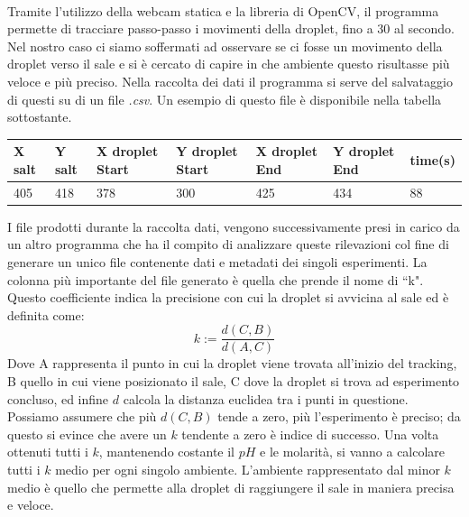 \\Tramite l'utilizzo della webcam statica e la libreria di OpenCV, il programma permette di tracciare passo-passo i movimenti della droplet, fino a 30 al secondo. \\Nel nostro caso ci siamo soffermati ad osservare se ci fosse un movimento della droplet verso il sale e si è cercato di capire in che ambiente questo risultasse più veloce e più preciso. Nella raccolta dei dati il programma si serve del salvataggio di questi su di un file \emph{.csv}. Un esempio di questo file è disponibile nella tabella sottostante. 
\begin{center}
\begin{tabular}{lllllll}
X salt & Y salt & X droplet Start & Y droplet Start & X droplet End & Y droplet End & time(s) \\
\hline
405    & 418    & 378             & 300             & 425           & 434           & 88  
\end{tabular}
\end{center}
I file prodotti durante la raccolta dati, vengono successivamente presi in carico da un altro programma che ha il compito di analizzare queste rilevazioni col fine di generare un unico file contenente dati e metadati dei singoli esperimenti. La colonna più importante del file generato è quella che prende il nome di ``k". Questo coefficiente indica la precisione con cui la droplet si avvicina al sale ed è definita come:
\begin{equation} 	
	k := \frac { d(C,B) }{ d(A,C) }
\end{equation}
Dove A rappresenta il punto in cui la droplet viene trovata all'inizio del tracking, B quello in cui viene posizionato il sale, C dove la droplet si trova ad esperimento concluso, ed infine $d$ calcola la distanza euclidea tra i punti in questione. 
\\Possiamo assumere che più $d(C,B)$ tende a zero, più l'esperimento è preciso; da questo si evince che avere un $k$ tendente a zero è indice di successo. Una volta ottenuti tutti i $k$, mantenendo costante il $pH$ e le molarità, si vanno a calcolare tutti i $k$ medio per ogni singolo ambiente. L'ambiente rappresentato dal minor $k$ medio è quello che permette alla droplet di raggiungere il sale in maniera precisa e veloce. 
